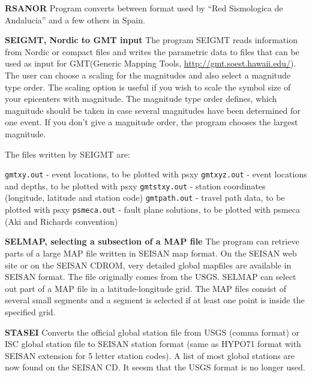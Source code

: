 \textbf{RSANOR} \newline
Program converts between format used by ``Red Sismologica de Andalucia'' and 
a few others in Spain. 

\textbf{SEIGMT, Nordic to GMT input} \newline
The program SEIGMT reads information from Nordic or compact files and writes the parametric data to files that can be used as input for GMT(Generic Mapping Tools, \url{http://gmt.soest.hawaii.edu/}). The user can choose a scaling for the magnitudes and also select a magnitude type order. The scaling option is useful if you wish to scale the symbol size of your epicenters with magnitude. The magnitude type order defines, which magnitude should be taken in case several magnitudes have been determined for one event. If you don't give a magnitude order, the program chooses the largest magnitude. 

The files written by SEIGMT are: 

\texttt{gmtxy.out} - event locations, to be plotted with psxy \newline
\texttt{gmtxyz.out} - event locations and depths, to be plotted with psxy \newline
\texttt{gmtstxy.out} - station coordinates (longitude, latitude and station code) \newline
\texttt{gmtpath.out} - travel path data, to be plotted with psxy \newline
\texttt{psmeca.out} - fault plane solutions, to be plotted with psmeca (Aki and Richards convention) 

\textbf{SELMAP, selecting a subsection of a MAP file} \newline
{}
The program can retrieve parts of a large MAP file written in SEISAN map format. On the SEISAN web site or on the SEISAN CDROM, very detailed global mapfiles are available in SEISAN format. The file originally comes from the USGS. SELMAP can select out part of a MAP file in a latitude-longitude grid. The MAP files consist of several small segments and a segment is selected if at least one point is inside the specified grid. 

\textbf{STASEI} \newline
{} 
Converts the official global station file from USGS (comma format) or ISC global station file to SEISAN station format (same as HYPO71 format with SEISAN extension for 5 letter station codes). A list of most global stations are now found on the SEISAN CD. It seesm that the USGS format is no longer used. 

